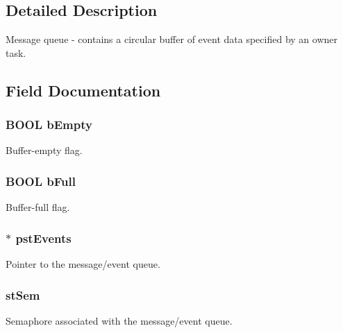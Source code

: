 \subsection{Detailed Description}
Message queue -\/ contains a circular buffer of event data specified by an owner task. 

\subsection{Field Documentation}
\subsubsection[{bEmpty}]{\setlength{\rightskip}{0pt plus 5cm}BOOL {\bf bEmpty}}\label{struct_m_e_s_s_a_g_e___s_t_r_u_c_t_a413cf93d9f466fcd9bbbe6d7be3072e8}


Buffer-\/empty flag. 
\subsubsection[{bFull}]{\setlength{\rightskip}{0pt plus 5cm}BOOL {\bf bFull}}\label{struct_m_e_s_s_a_g_e___s_t_r_u_c_t_a144e5fe99cb16dfc26009e78de4a60f7}


Buffer-\/full flag. 
\subsubsection[{pstEvents}]{$\ast$ {\bf pstEvents}}\label{struct_m_e_s_s_a_g_e___s_t_r_u_c_t_a869e1735cda8e2a136b9ed66bb0d3837}


Pointer to the message/event queue. 
\subsubsection[{stSem}]{ {\bf stSem}}\label{struct_m_e_s_s_a_g_e___s_t_r_u_c_t_a477ffa96d2963b88824da898e708dc45}


Semaphore associated with the message/event queue. 
